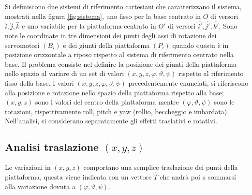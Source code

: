 \documentclass[12pt,twoside,openright]{report}
\begin{document}
Si definiscono due sistemi di riferimento cartesiani che caratterizzano il sistema, mostrati nella figura \ref{fig:sistema}, uno fisso per la base centrato in $O$ di versori $\hat{i},\hat{j},\hat{k}$ e uno variabile per la piattaforma centrato in $O'$ di versori $\hat{i'},\hat{j'},\hat{k'}$. Sono note le coordinate in tre dimensioni dei punti degli assi di rotazione dei servomotori $({B_i})$ e dei giunti della piattaforma $(P_i)$ quando questa è in posizione orizzontale a riposo rispetto al sistema di riferimento centrato nella base. Il problema consiste nel definire la posizione dei giunti della piattaforma nello spazio al variare di un set di valori $(x,y,z,\varphi,\vartheta,\psi)$ rispetto al riferimento fisso della base. I valori $(x,y,z,\varphi,\vartheta,\psi)$ precedentemente enunciati, si riferiscono alla posizione e rotazione nello spazio della piattaforma rispetto alla base; $(x,y,z)$ sono i valori del centro della piattaforma mentre $(\varphi,\vartheta,\psi)$ sono le rotazioni, rispettivamente roll, pitch e yaw (rollio, beccheggio e imbardata). Nell'analisi, si considerano separatamente gli effetti traslativi e rotativi.




\subsection{Analisi traslazione \boldmath$(x,y,z)$}\label{xyz}
Le variazioni in $(x,y,z)$ comportano una semplice traslazione dei punti della piattaforma, questa viene indicata con un vettore $\hat T$ che andrà poi a sommarsi alla variazione dovuta a $(\varphi,\vartheta,\psi)$.
\end{document}

